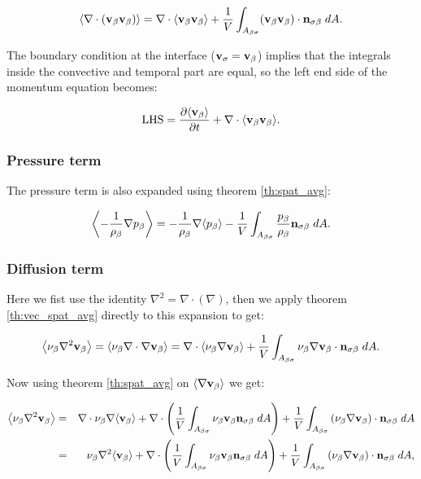 \begin{equation}
{\left< \nabla \cdot (\textbf{v}_{\beta}\textbf{v}_{\beta}) \right>} = \nabla \cdot {\left< \textbf{v}_{\beta}\textbf{v}_{\beta}\right>} + \dfrac{1}{V} \int_{A_{\beta \sigma}}  (\textbf{v}_{\beta} \textbf{v}_{\beta}) \cdot \mathbf{n}_{\sigma \beta} \;dA.
\end{equation}

The boundary condition at the interface ($\textbf{v}_{\sigma} = \textbf{v}_{\beta}$) implies that the integrals inside the convective and temporal part are equal, so the left end side of the momentum equation becomes:

\begin{equation}
\text{LHS} = \dfrac{\partial {\left< \textbf{v}_{\beta}\right>}}{\partial t} + \nabla \cdot {\left< \textbf{v}_{\beta}\textbf{v}_{\beta}\right>}.
\label{eq:lhs}
\end{equation}

\subsubsection{Pressure term}
The pressure term is also expanded using theorem \eqref{th:spat_avg}:

\begin{equation}
{\left< -\dfrac{1}{\rho_{\beta}} \nabla p_{\beta}\right>} = -\dfrac{1}{\rho_{\beta}} \nabla {\left< p_{\beta}\right>} -\dfrac{1}{V} \int_{A_{\beta \sigma}}  \dfrac{p_{\beta}}{\rho_{\beta}} \mathbf{n}_{\sigma \beta} \;dA.
\end{equation}

\subsubsection{Diffusion term}
Here we fist use the identity $\nabla^2 = \nabla \cdot (\nabla)$, then we apply theorem \eqref{th:vec_spat_avg} directly to this expansion to get:

\begin{equation}
{\left< \nu_{\beta}\nabla^2 \textbf{v}_{\beta}\right>} = {\left< \nu_{\beta}\nabla \cdot \nabla \textbf{v}_{\beta} \right>} = \nabla \cdot {\left< \nu_{\beta}\nabla \textbf{v}_{\beta}\right>} +\dfrac{1}{V} \int_{A_{\beta \sigma}}  \nu_{\beta} \nabla \textbf{v}_{\beta} \cdot \mathbf{n}_{\sigma \beta} \;dA.
\label{eq:4_1}
\end{equation}

\noindent Now using theorem \eqref{th:spat_avg} on ${\left< \nabla \textbf{v}_{\beta} \right>}$ we get:

\begin{eqnarray}
	{\left< \nu_{\beta}\nabla^2 \textbf{v}_{\beta}\right>} &=& \nabla \cdot \nu_{\beta} \nabla {\left< \textbf{v}_{\beta}\right>} + \nabla \cdot \left( \dfrac{1}{V} \int_{A_{\beta \sigma}}  \nu_{\beta} \textbf{v}_{\beta}  \mathbf{n}_{\sigma \beta} \;dA \right) + \dfrac{1}{V} \int_{A_{\beta \sigma}} \left( \nu_{\beta} \nabla \textbf{v}_{\beta} \right) \cdot \mathbf{n}_{\sigma \beta} \;dA  \nonumber \\
	&=& \nu_{\beta}\nabla^2 {\left< \textbf{v}_{\beta} \right>} +  \nabla \cdot \left( \dfrac{1}{V} \int_{A_{\beta \sigma}}  \nu_{\beta} \textbf{v}_{\beta} \mathbf{n}_{\sigma \beta} \;dA \right) + \dfrac{1}{V} \int_{A_{\beta \sigma}} \left( \nu_{\beta} \nabla \textbf{v}_{\beta} \right) \cdot \mathbf{n}_{\sigma \beta} \;dA,   \nonumber
\end{eqnarray}

